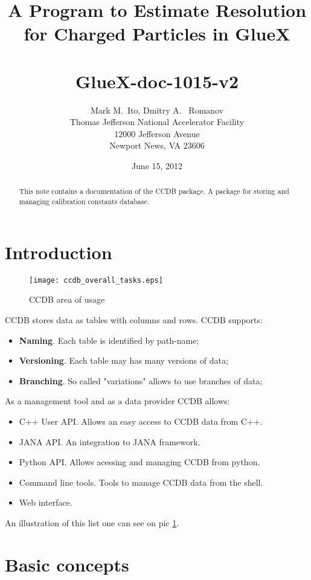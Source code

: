 \documentclass{article}
\title{A Program to Estimate Resolution for Charged Particles in GlueX \\
~\\
\large GlueX-doc-1015-v2
}
\author{Mark M.\ Ito, Dmitry A. \ Romanov \\
Thomas Jefferson National Accelerator Facility \\
12000 Jefferson Avenue \\
Newport News, VA 23606
}
\date{June 15, 2012}
\begin{document}


\maketitle

\begin{abstract}
This note contains a documentation of the CCDB package. A package for storing and managing calibration constants database.
\end{abstract}

\tableofcontents

\section{Introduction}


\begin{figure}
  \texttt{[image: ccdb\_overall\_tasks.eps]}\\
  \caption{CCDB area of usage}\label{fig:ccdb_overall_tasks}
\end{figure}

CCDB stores data as tables with columns and rows. CCDB supports:
\begin{itemize}
\item \textbf{Naming}. Each table is identified by path-name;
\item \textbf{Versioning}. Each table may has many versions of data;
\item \textbf{Branching}. So called "variations" allows to use branches of data;
\end{itemize}

As a management tool and as a data provider CCDB allows:
\begin{itemize}
\item C++ User API. Allows an easy access to CCDB data from C++.
\item JANA API. An integration to JANA framework.
\item Python API. Allows acessing and managing CCDB from python.
\item Command line tools. Tools to manage CCDB data from the shell.
\item Web interface.
\end{itemize}
An illustration of this list one can see on pic \ref{fig:ccdb_overall_tasks}.

\section{Basic concepts}\label{sec:using}
\end{document}
